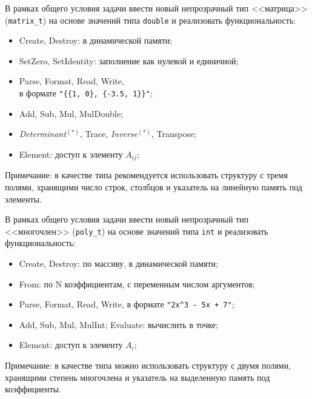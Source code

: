 
\begin{zztask}
В рамках общего условия задачи ввести новый непрозрачный тип <<матрица>>
(\texttt{matrix\_t}) на основе значений типа \texttt{double} и реализовать
функциональность:
%
\begin{itemize}
\item Create, Destroy: в динамической памяти;
\item SetZero, SetIdentity: заполнение как нулевой и единичной;
\item Parse, Format, Read, Write,\\ в формате \verb|"{{1, 0}, {-3.5, 1}}"|;
\item Add, Sub, Mul, MulDouble;
\item \textit{Determinant}${}^{(\ast)}$, Trace, \textit{Inverse}${}^{(\ast)}$, Transpose;
\item Element: доступ к элементу $A_{ij}$;
\end{itemize}
%
Примечание: в качестве типа рекомендуется использовать структуру с тремя
полями, хранящими число строк, столбцов и указатель на линейную память под
элементы.
\end{zztask}


\begin{zztask}[Многочлены]
В рамках общего условия задачи ввести новый непрозрачный тип <<многочлен>>
(\texttt{poly\_t}) на основе значений типа \texttt{int} и реализовать
функциональность:
%
\begin{itemize}
\item Create, Destroy: по массиву, в динамической памяти;
\item From: по N коэффициентам, с переменным числом аргументов;
\item Parse, Format, Read, Write, в формате \verb|"2x^3 - 5x + 7"|;
\item Add, Sub, Mul, MulInt; Evaluate: вычислить в точке;
\item Element: доступ к элементу $A_{i}$;
\end{itemize}
%
Примечание: в качестве типа можно использовать структуру с двумя полями,
хранящими степень многочлена и указатель на выделенную память под
коэффициенты.
\end{zztask}


